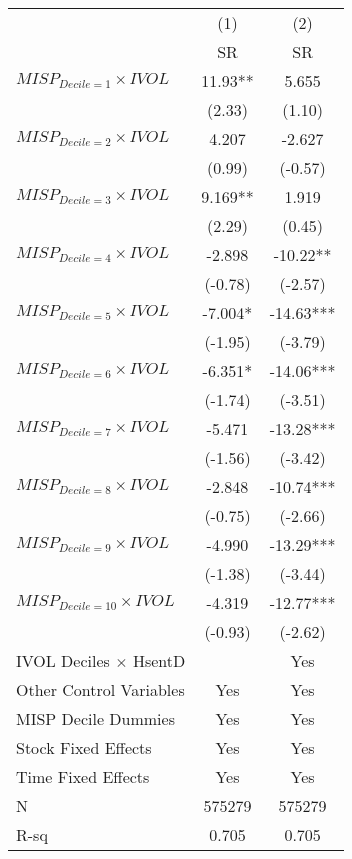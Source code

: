 \begin{tabular}{lcc}
\toprule
        & (1)     & (2) \\
        & SR      & SR \\
\midrule
$MISP_{Decile = 1} \times IVOL$ & 11.93** & 5.655 \\
        & (2.33)  & (1.10) \\
$MISP_{Decile = 2} \times IVOL$ & 4.207   & -2.627 \\
        & (0.99)  & (-0.57) \\
$MISP_{Decile = 3} \times IVOL$ & 9.169** & 1.919 \\
        & (2.29)  & (0.45) \\
$MISP_{Decile = 4} \times IVOL$ & -2.898  & -10.22** \\
        & (-0.78) & (-2.57) \\
$MISP_{Decile = 5} \times IVOL$ & -7.004* & -14.63*** \\
        & (-1.95) & (-3.79) \\
$MISP_{Decile = 6} \times IVOL$ & -6.351* & -14.06*** \\
        & (-1.74) & (-3.51) \\
$MISP_{Decile = 7} \times IVOL$ & -5.471  & -13.28*** \\
        & (-1.56) & (-3.42) \\
$MISP_{Decile = 8} \times IVOL$ & -2.848  & -10.74*** \\
        & (-0.75) & (-2.66) \\
$MISP_{Decile = 9} \times IVOL$ & -4.990  & -13.29*** \\
        & (-1.38) & (-3.44) \\
$MISP_{Decile = 10} \times IVOL$ & -4.319  & -12.77*** \\
        & (-0.93) & (-2.62) \\
\midrule
IVOL Deciles $\times$ HsentD &         & Yes \\
Other Control Variables & Yes     & Yes \\
MISP Decile Dummies & Yes     & Yes \\
Stock Fixed Effects & Yes     & Yes \\
Time Fixed Effects & Yes     & Yes \\
N       & 575279  & 575279 \\
R-sq    & 0.705   & 0.705 \\
\bottomrule
\end{tabular}%

